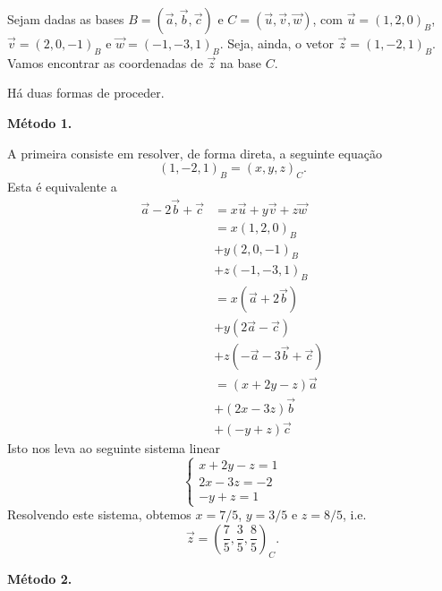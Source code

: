 \begin{ex}
  Sejam dadas as bases $B = (\vec{a},\vec{b},\vec{c})$ e $C = (\vec{u},\vec{v},\vec{w})$, com $\vec{u}=(1,2,0)_B$, $\vec{v}=(2,0,-1)_B$ e $\vec{w}=(-1,-3,1)_B$. Seja, ainda, o vetor $\vec{z} = (1,-2,1)_B$. Vamos encontrar as coordenadas de $\vec{z}$ na base $C$.

  Há duas formas de proceder.

  {\bf Método 1.}
  
  A primeira consiste em resolver, de forma direta, a seguinte equação
  \begin{equation}
    (1,-2,1)_B = (x,y,z)_C.
  \end{equation}
  Esta é equivalente a
  \begin{align}
    \vec{a}-2\vec{b}+\vec{c} &= x\vec{u}+y\vec{v}+z\vec{w} \\
            &= x(1,2,0)_B \\
            &+ y(2,0,-1)_B\\
            &+ z(-1,-3,1)_B\\
            &= x(\vec{a}+2\vec{b})\\
            &+ y(2\vec{a}-\vec{c})\\
            &+ z(-\vec{a}-3\vec{b}+\vec{c})\\
            &= (x+2y-z)\vec{a}\\
            &+ (2x-3z)\vec{b}\\
            &+ (-y+z)\vec{c}
  \end{align}
  Isto nos leva ao seguinte sistema linear
  \begin{equation}
    \left\{
      \begin{array}{l}
        x+2y-z=1\\
        2x-3z=-2\\
        -y+z=1
      \end{array}
\right.
\end{equation}
Resolvendo este sistema, obtemos $x=7/5$, $y=3/5$ e $z=8/5$, i.e.
\begin{equation}
  \vec{z} = \left(\frac{7}{5},\frac{3}{5},\frac{8}{5}\right)_C.
\end{equation}

  {\bf Método 2.}


\end{ex}
